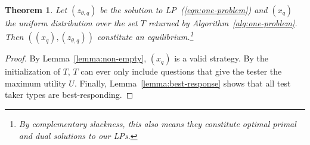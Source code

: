 \documentclass{article}
\newtheorem{theorem}{Theorem}
\begin{document}

\begin{theorem}
Let $(z_{\theta,q})$ be the solution to LP~(\ref{eqn:one-problem}) and
$(x_q)$ the uniform distribution over the set 
 $T$ returned by Algorithm~\ref{alg:one-problem}.  Then
 $((x_q),(z_{\theta,q}))$ constitute an equilibrium.\footnote{By
   complementary slackness, this also means they constitute optimal primal
   and dual solutions to our LPs.}
\end{theorem}
\begin{proof}
By Lemma~\ref{lemma:non-empty}, $(x_q)$ is a valid strategy. 
By the initialization of $T$, $T$ can ever only include questions
that give the tester the maximum utility $U$.
Finally, Lemma~\ref{lemma:best-response} shows that all test taker types
are best-responding.
\end{proof}
\end{document}

